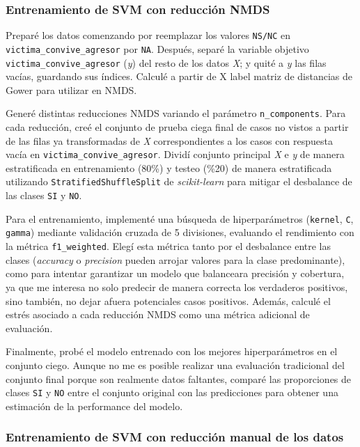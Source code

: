 \documentclass[10 pt]{article}
\begin{document}
\subsubsection{Entrenamiento de SVM con reducción NMDS}

Preparé los datos comenzando por reemplazar los valores \texttt{NS/NC} en \texttt{victima\_convive\_agresor} por \texttt{NA}. Después, separé la variable objetivo \texttt{victima\_convive\_agresor} (\textit{y}) del resto de los datos \textit{X}; y quité a \textit{y} las filas vacías, guardando sus índices. Calculé a partir de X label matriz de distancias de Gower para utilizar en NMDS.

Generé distintas reducciones NMDS variando el parámetro \texttt{n\_components}. Para cada reducción, creé el conjunto de prueba ciega final de casos no vistos a partir de las filas ya transformadas de \textit{X} correspondientes a los casos con respuesta vacía en \texttt{victima\_convive\_agresor}. Dividí conjunto principal \textit{X} e \textit{y} de manera estratificada en entrenamiento (80\%) y testeo (\%20) de manera estratificada utilizando \texttt{StratifiedShuffleSplit} de \textit{scikit-learn}\citetext{\citealp{scikit-learn}} para mitigar el desbalance de las clases \texttt{SI} y \texttt{NO}.

Para el entrenamiento, implementé una búsqueda de hiperparámetros (\texttt{kernel}, \texttt{C}, \texttt{gamma}) mediante validación cruzada de 5 divisiones, evaluando el rendimiento con la métrica \texttt{f1\_weighted}. Elegí esta métrica tanto por el desbalance entre las clases (\textit{accuracy} o \textit{precision} pueden arrojar valores para la clase predominante), como para intentar garantizar un modelo que balanceara precisión y cobertura, ya que me interesa no solo predecir de manera correcta los verdaderos positivos, sino también, no dejar afuera potenciales casos positivos. Además, calculé el estrés asociado a cada reducción NMDS como una métrica adicional de evaluación.


Finalmente, probé el modelo entrenado con los mejores hiperparámetros en el conjunto ciego. Aunque no me es posible realizar una evaluación tradicional del conjunto final porque son realmente datos faltantes, comparé las proporciones de clases \texttt{SI} y \texttt{NO} entre el conjunto original con las predicciones para obtener una estimación de la performance del modelo. 


\subsubsection{Entrenamiento de SVM con reducción manual de los datos}
\end{document}
